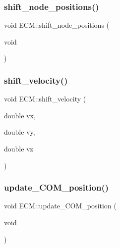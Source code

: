 \subsubsection{\texorpdfstring{shift\_node\_positions()}{shift\_node\_positions()}}
{\footnotesize\ttfamily void E\+C\+M\+::shift\+\_\+node\+\_\+positions (\begin{DoxyParamCaption}\item[{void}]{ }\end{DoxyParamCaption})\hspace{0.3cm}{\ttfamily [inline]}}

\mbox{\label{classECM_ae65e79751887e704a963f66e240057fe}} 
\subsubsection{\texorpdfstring{shift\_velocity()}{shift\_velocity()}}
{\footnotesize\ttfamily void E\+C\+M\+::shift\+\_\+velocity (\begin{DoxyParamCaption}\item[{double}]{vx,  }\item[{double}]{vy,  }\item[{double}]{vz }\end{DoxyParamCaption})\hspace{0.3cm}{\ttfamily [inline]}}

\mbox{\label{classECM_a492d0690a480a0f0fdfcef3ef35bc970}} 
\subsubsection{\texorpdfstring{update\_COM\_position()}{update\_COM\_position()}}
{\footnotesize\ttfamily void E\+C\+M\+::update\+\_\+\+C\+O\+M\+\_\+position (\begin{DoxyParamCaption}\item[{void}]{ }\end{DoxyParamCaption})\hspace{0.3cm}{\ttfamily [inline]}}

\mbox{\label{classECM_a7272481293ee528878aeb669343bcd4f}} 
